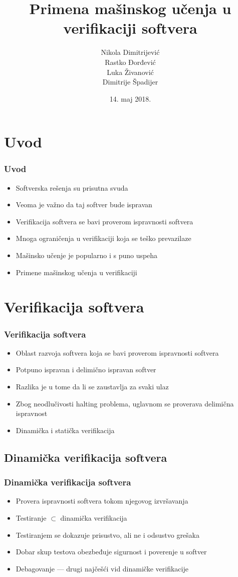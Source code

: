 \documentclass[11pt]{beamer}
\title{Primena mašinskog učenja u verifikaciji softvera}
\author[\hspace{-0.8em}N. Dimitrijević, R. Đorđević, L. Živanović, D. Špadijer]
		{Nikola Dimitrijević\\ %
        Rastko Đorđević\\ %
        Luka Živanović\\ %
        Dimitrije Špadijer} %
\date{14. maj 2018.}
\theoremstyle{definition}
\begin{document}
\begin{frame}
\titlepage
\end{frame}

\section{Uvod}
\label{sec:uvod}
\begin{frame}
\frametitle{Uvod}
\begin{itemize}
\item Softverska rešenja su prisutna svuda
\item Veoma je važno da taj softver bude ispravan
\item Verifikacija softvera se bavi proverom ispravnosti softvera
\item Mnoga ograničenja u verifikaciji koja se teško prevazilaze
\item Mašinsko učenje je popularno i s puno uspeha
\item Primene mašinskog učenja u verifikaciji
\end{itemize}

\end{frame}
\section{Verifikacija softvera}
\label{sec:verifikacija}
\begin{frame}
\frametitle{Verifikacija softvera}
\begin{itemize}
\item Oblast razvoja softvera koja se bavi proverom ispravnosti softvera
\item Potpuno ispravan i delimično ispravan softver
\item Razlika je u tome da li se zaustavlja za svaki ulaz
\item Zbog neodlučivosti halting problema, uglavnom se proverava delimična ispravnost
\item Dinamička i statička verifikacija \cite{milena}
\end{itemize}
\end{frame}

\subsection{Dinamička verifikacija softvera}
\label{subsec:dinamicka}
\begin{frame}
\frametitle{Dinamička verifikacija softvera}
\begin{itemize}
\item Provera ispravnosti softvera tokom njegovog izvršavanja
\item Testiranje $\subset$ dinamička verifikacija
\item Testiranjem se dokazuje prisustvo, ali ne i odsustvo grešaka
\item Dobar skup testova obezbeđuje sigurnost i poverenje u softver
\item Debagovanje --- drugi najčešći vid dinamičke verifikacije
\end{itemize}
\end{frame}
\end{document}
